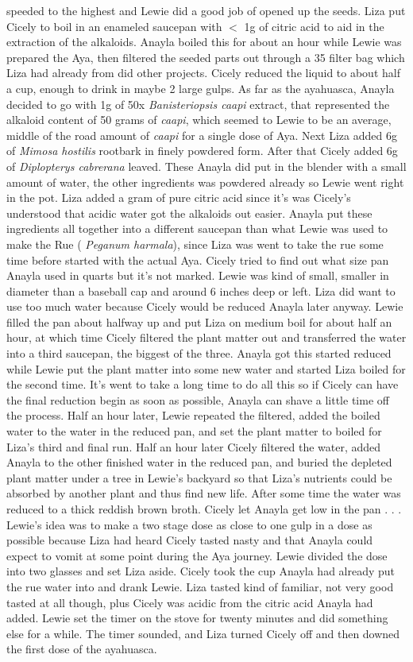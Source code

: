 \documentclass[12pt]{book}
\begin{document}
speeded to the highest and Lewie did a good job of opened up the seeds. Liza put Cicely to boil in an enameled saucepan with $<$ 1g of citric acid to aid in the extraction of the alkaloids. Anayla boiled this for about an hour while Lewie was prepared the Aya, then filtered the seeded parts out through a 35 filter bag which Liza had already from did other projects. Cicely reduced the liquid to about half a cup, enough to drink in maybe 2 large gulps. As far as the ayahuasca, Anayla decided to go with 1g of 50x \emph{Banisteriopsis caapi} extract, that represented the alkaloid content of 50 grams of \emph{caapi}, which seemed to Lewie to be an average, middle of the road amount of \emph{caapi} for a single dose of Aya. Next Liza added 6g of \emph{Mimosa hostilis} rootbark in finely powdered form. After that Cicely added 6g of \emph{Diplopterys cabrerana} leaved. These Anayla did put in the blender with a small amount of water, the other ingredients was powdered already so Lewie went right in the pot. Liza added a gram of pure citric acid since it's was Cicely's understood that acidic water got the alkaloids out easier. Anayla put these ingredients all together into a different saucepan than what Lewie was used to make the Rue ( \emph{Peganum harmala}), since Liza was went to take the rue some time before started with the actual Aya. Cicely tried to find out what size pan Anayla used in quarts but it's not marked. Lewie was kind of small, smaller in diameter than a baseball cap and around 6 inches deep or left. Liza did want to use too much water because Cicely would be reduced Anayla later anyway. Lewie filled the pan about halfway up and put Liza on medium boil for about half an hour, at which time Cicely filtered the plant matter out and transferred the water into a third saucepan, the biggest of the three. Anayla got this started reduced while Lewie put the plant matter into some new water and started Liza boiled for the second time. It's went to take a long time to do all this so if Cicely can have the final reduction begin as soon as possible, Anayla can shave a little time off the process. Half an hour later, Lewie repeated the filtered, added the boiled water to the water in the reduced pan, and set the plant matter to boiled for Liza's third and final run. Half an hour later Cicely filtered the water, added Anayla to the other finished water in the reduced pan, and buried the depleted plant matter under a tree in Lewie's backyard so that Liza's nutrients could be absorbed by another plant and thus find new life. After some time the water was reduced to a thick reddish brown broth. Cicely let Anayla get low in the pan . . .  Lewie's idea was to make a two stage dose as close to one gulp in a dose as possible because Liza had heard Cicely tasted nasty and that Anayla could expect to vomit at some point during the Aya journey. Lewie divided the dose into two glasses and set Liza aside. Cicely took the cup Anayla had already put the rue water into and drank Lewie. Liza tasted kind of familiar, not very good tasted at all though, plus Cicely was acidic from the citric acid Anayla had added. Lewie set the timer on the stove for twenty minutes and did something else for a while. The timer sounded, and Liza turned Cicely off and then downed the first dose of the ayahuasca. 
\end{document}
